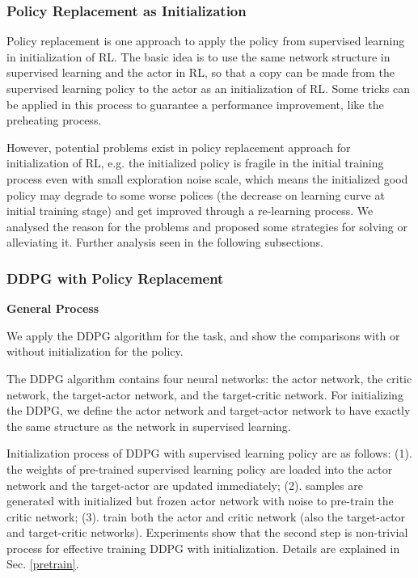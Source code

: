 \documentclass{article}
\begin{document}
\subsubsection{Policy Replacement as Initialization}
Policy replacement is one approach to apply the policy from supervised learning in initialization of RL. The basic idea is to use the same network structure in supervised learning and the actor in RL, so that a copy can be made from the supervised learning policy to the actor as an initialization of RL. Some tricks can be applied in this process to guarantee a performance improvement, like the preheating process. 

However, potential problems exist in policy replacement approach for initialization of RL, e.g. the initialized policy is fragile in the initial training process even with small exploration noise scale, which means the initialized good policy may degrade to some worse polices (the decrease on learning curve at initial training stage) and get improved through a re-learning process. We analysed the reason for the problems and proposed some strategies for solving or alleviating it. Further analysis seen in the following subsections.

\subsubsection{DDPG with Policy Replacement}
\textbf{General Process}

We apply the DDPG algorithm for the task, and show the comparisons with or without initialization for the policy.

The DDPG algorithm contains four neural networks: the actor network, the critic network, the target-actor network, and the target-critic network. For initializing the DDPG, we define the actor network and target-actor network to have exactly the same structure as the network in supervised learning. 

Initialization process of DDPG with supervised learning policy are as follows: 
(1). the weights of pre-trained supervised learning policy are loaded into the actor network and the target-actor are updated immediately; (2). samples are generated with initialized but frozen actor network with noise to pre-train the critic network; (3). train both the actor and critic network (also the target-actor and target-critic networks). Experiments show that the second step is non-trivial process for effective training DDPG with initialization. Details are explained in Sec. \ref{pretrain}.
\end{document}
